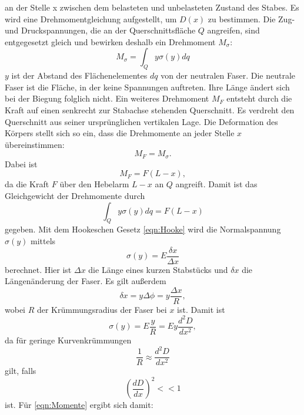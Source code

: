 an der Stelle x zwischen dem belasteten und unbelasteten Zustand des Stabes.
Es wird eine Drehmomentgleichung aufgestellt, um $D(x)$ zu bestimmen.
Die Zug- und Druckspannungen, die an der Querschnittsfläche $Q$ angreifen,
sind entgegesetzt gleich und bewirken deshalb ein Drehmoment $M_{\sigma}$:
\begin{equation*}
M_{\sigma} = \int_{Q} y \sigma(y) dq
\end{equation*}
$y$ ist der Abstand des Flächenelementes $dq$ von der neutralen
Faser. Die neutrale Faser ist die Fläche, in der keine Spannungen
auftreten. Ihre Länge ändert sich bei der Biegung folglich nicht.
Ein weiteres Drehmoment $M_{F}$ entsteht durch die Kraft auf einen senkrecht
zur Stabachse stehenden Querschnitt. Es verdreht den Querschnitt aus 
seiner ursprünglichen vertikalen Lage.
Die Deformation des Körpers stellt sich so ein, dass die Drehmomente an
jeder Stelle $x$ übereinstimmen:
\begin{equation*}
M_{F} = M_{\sigma}.
\end{equation*}
Dabei ist
\begin{equation*}
M_{F} = F (L-x),
\end{equation*}
da die Kraft $F$ über den Hebelarm $L-x$ an $Q$ angreift.
Damit ist das Gleichgewicht der Drehmomente durch
\begin{equation}
\int_{Q} y \sigma(y) dq = F(L-x)
\label{eqn:Momente}
\end{equation}
gegeben.
Mit dem Hookeschen Gesetz \eqref{eqn:Hooke} wird die Normalspannung
$\sigma(y)$ mittels
\begin{equation*}
\sigma(y) = E \frac{\delta x}{\Delta x}
\end{equation*}
berechnet. Hier ist $\Delta x$ die Länge eines kurzen Stabstücks
und $\delta x$ die Längenänderung der Faser.
Es gilt außerdem
\begin{equation*}
\delta x = y \Delta \phi = y \frac{\Delta x}{R},
\end{equation*}
wobei $R$ der Krümmungsradius der Faser bei $x$ ist.
Damit ist
\begin{equation*}
\sigma(y) = E \frac{y}{R} = E y \frac{d^2D}{dx^2},
\end{equation*}
da für geringe Kurvenkrümmungen
\begin{equation*}
\frac{1}{R} \approx \frac{d^2D}{dx^2}
\end{equation*}
gilt, falls
\begin{equation*}
(\frac{dD}{dx})^2 << 1
\end{equation*}
ist. Für \eqref{eqn:Momente} ergibt sich damit:
